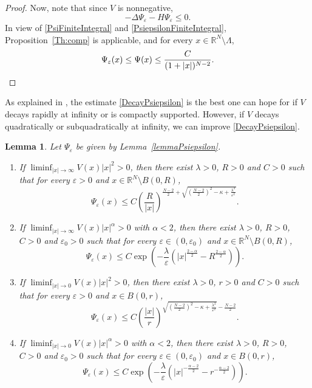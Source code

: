 \documentclass[a4paper]{amsart}
\newtheorem{lemma}[proposition]{Lemma}
\begin{document}
\begin{proof}
Now, note that since $V$ is nonnegative,
\[
 -\Delta \Psi_\varepsilon -H \Psi_\varepsilon \leq 0.
\]
In view of \eqref{PsiFiniteIntegral} and \eqref{PsiepsilonFiniteIntegral}, Proposition~\ref{Th:comp} is applicable, and
for every $x \in {\mathbb{R}}^N\setminus \Lambda$,
\[
 \Psi_\varepsilon(x) \leq \Psi(x) \leq \frac{C}{(1+{\left| {x} \right|})^{N-2}}.\qedhere
\]
\end{proof}

As explained in \cite{MVS}, the estimate \eqref{DecayPsiepsilon} is the best one can hope for if $V$ decays rapidly at infinity
or is compactly supported. However, if $V$ decays quadratically or subquadratically at infinity, we can improve
\eqref{DecayPsiepsilon}.

\begin{lemma}
\label{lemmaImprovedDecay}
Let $\Psi_\varepsilon$ be given by Lemma~\ref{lemmaPsiepsilon}.
\begin{enumerate}[(1)]
\item \label{Psiepsiloninfinityquadratic} If $\liminf_{{\left| {x} \right|}\rightarrow\infty} V(x){\left| {x} \right|}^{2} > 0$, then there exist
$\lambda > 0$, $R > 0$ and $C > 0$ such that for every $\varepsilon > 0$ and $x \in {\mathbb{R}}^N\setminus B(0,R)$, 
\[
  \Psi_\varepsilon (x) \leq
C\left(\frac{R}{{\left| {x} \right|}}\right)^{\frac{N-2}{2}+\sqrt{\left(\frac{N-2}{2}\right)^2 - \kappa
+ \frac{\lambda^2}{\varepsilon^2}}}.
\]
\item \label{PsiepsiloninfinitySuperquadratic} If $\liminf_{{\left| {x} \right|}\rightarrow\infty} V(x){\left| {x} \right|}^{\alpha} > 0$ with
$\alpha < 2$, then there exist $\lambda > 0$, $R > 0$, $C > 0$ and $\varepsilon_0 > 0$ such that for every 
$\varepsilon \in (0,\varepsilon_0)$ and $x \in {\mathbb{R}}^N\setminus B(0,R)$, 
\[
  \Psi_\varepsilon (x) \leq C\exp \left(-\frac{\lambda}{\varepsilon}
\left({\left| {x} \right|}^\frac{2-\alpha}{2}-R^\frac{2-\alpha}{2}\right)\right).
\]
\item  If $\liminf_{{\left| {x} \right|}\rightarrow 0} V(x){\left| {x} \right|}^{2} > 0$, then there exist $\lambda > 0$, $r > 0$ and $C > 0$
such that for every $\varepsilon > 0$ and $x \in B(0,r)$, 
\[
  \Psi_\varepsilon (x) \leq
C\left(\frac{{\left| {x} \right|}}{r}\right)^{\sqrt{\left(\frac{N-2}{2}\right)^2 -\kappa
+\frac{\lambda^2}{\varepsilon^2}}-\frac{N-2}{2}}.
\]
\item If $\liminf_{{\left| {x} \right|}\rightarrow 0} V(x){\left| {x} \right|}^{\alpha} > 0$ with $\alpha < 2$, then there exist $\lambda >
0$, $R > 0$, $C > 0$ and $\varepsilon_0 > 0$ such that for every $\varepsilon \in (0,\varepsilon_0)$ and $x \in B(0,r)$, 
\[
  \Psi_\varepsilon (x) \leq C\exp \left(-\frac{\lambda}{\varepsilon}
\left({\left| {x} \right|}^{-\frac{\alpha-2}{2}}-r^{-\frac{\alpha-2}{2}}\right)\right).
\]
\end{enumerate}
\end{lemma}
\end{document}
